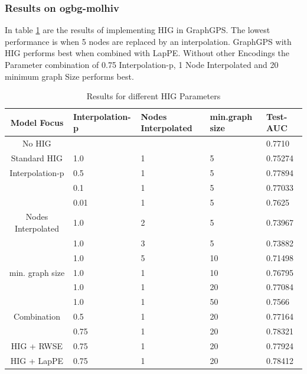\subsubsection{Results on ogbg-molhiv}
In table \ref{hig_results} are the results of implementing HIG in GraphGPS. The lowest performance is when 5 nodes are replaced by an interpolation. GraphGPS with HIG performs best when combined with LapPE\cite{2023graphgps}. Without other Encodings the Parameter combination of 0.75 Interpolation-p, 1 Node Interpolated and 20 minimum graph Size performs best.
\begin{table}[ht!]
    \centering
    \caption{Results for different HIG Parameters}
    \label{hig_results}
    \begin{tabular}{c || l|l|l|l|}
        Model Focus            & Interpolation-p & Nodes Interpolated & min.graph size & Test-AUC \\
        \hline
        \hline
        No HIG    &     &    &               &  0.7710  \\
        \hline
        Standard HIG      &  1.0& 1& 5            & 0.75274  \\
        \hline
        Interpolation-p               & 0.5& 1& 5                    & 0.77894  \\
                           & 0.1& 1& 5                    & 0.77033  \\
                           & 0.01& 1& 5                   & 0.7625   \\
        \hline
        Nodes Interpolated & 1.0& 2& 5                      & 0.73967  \\
                 & 1.0& 3& 5                      & 0.73882  \\
                                   & 1.0& 5& 10                      & 0.71498  \\
        \hline
        min. graph size    & 1.0& 1& 10                & 0.76795  \\
                 & 1.0& 1& 20                & 0.77084  \\
                           & 1.0& 1& 50                & 0.7566   \\
        \hline
        Combination   & 0.5& 1& 20                & 0.77164  \\
            & 0.75& 1& 20                & 0.78321  \\
        \hline
        HIG + RWSE   & 0.75& 1& 20                & 0.77924  \\
        \hline
        HIG + LapPE   & 0.75& 1& 20                & 0.78412  \\
    \end{tabular}
\end{table}


